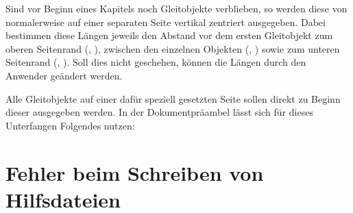\begin{Declaration}
  {}
\begin{Declaration}
  {}
\begin{Declaration}
  {}
\begin{Declaration}
  {}
\begin{Declaration}
  {}
\begin{Declaration}
  {}
\printdeclarationlist[Längen]

Sind vor Beginn eines Kapitels noch Gleitobjekte verblieben, so werden diese 
von  normalerweise auf einer separaten Seite vertikal zentriert 
ausgegeben. Dabei bestimmen diese Längen jeweils den Abstand vor dem ersten 
Gleitobjekt zum oberen Seitenrand (, ), 
zwischen den einzelnen Objekten (, ) sowie 
zum unteren Seitenrand (, ). Soll dies nicht 
geschehen, können die Längen durch den Anwender geändert werden.
\end{Declaration}
\end{Declaration}
\end{Declaration}
\end{Declaration}
\end{Declaration}
\end{Declaration}
%
\begin{Example}
Alle Gleitobjekte auf einer dafür speziell gesetzten Seite sollen direkt zu 
Beginn dieser ausgegeben werden. In der Dokumentpräambel lässt sich für dieses 
Unterfangen Folgendes nutzen:
\begin{Code}
\makeatletter
\setlength{\@fptop}{0pt}
\setlength{\@dblfptop}{0pt}%
\makeatother
\end{Code}
\end{Example}



\section{%
  Fehler beim Schreiben von Hilfsdateien%
  \label{sec:tips:write}%
}

